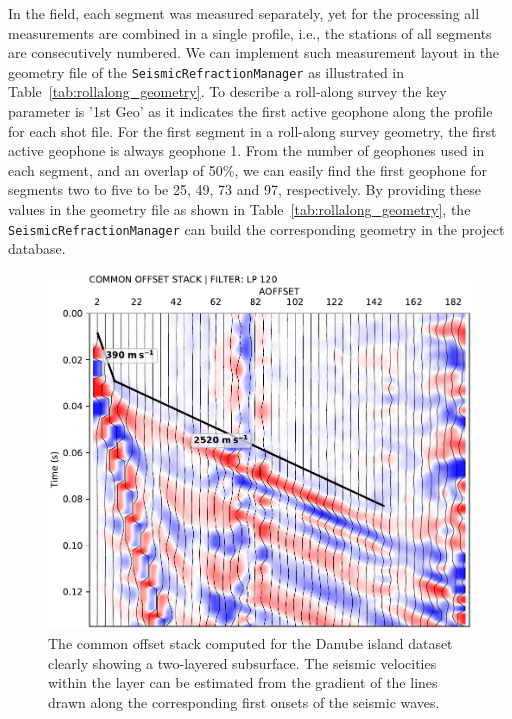 \documentclass[a4paper,fleqn]{cas-sc}
\begin{document}
In the field, each segment was measured separately, yet for the processing all measurements are combined in a single profile, i.e., the stations of all segments are consecutively numbered.
We can implement such measurement layout in the geometry file of the \texttt{SeismicRefractionManager} as illustrated in Table~\ref{tab:rollalong_geometry}. To describe a roll-along survey the key parameter is '1st Geo' as it indicates the first active geophone along the profile for each shot file. For the first segment in a roll-along survey geometry, the first active geophone is always geophone 1. From the number of geophones used in each segment, and an overlap of 50\%, we can easily find the first geophone for segments two to five to be 25, 49, 73 and 97, respectively. By providing these values in the geometry file as shown in Table~\ref{tab:rollalong_geometry}, the \texttt{SeismicRefractionManager} can build the corresponding geometry in the project database.

\begin{figure}
	\centering
	\includegraphics[width=.75\textwidth]{figures/danube_island_cos_lp120.pdf}
	\caption{The common offset stack computed for the Danube island dataset clearly showing a two-layered subsurface. The seismic velocities within the layer can be estimated from the gradient of the lines drawn along the corresponding first onsets of the seismic waves.}
	\label{fig:fieldcos}
\end{figure}
\end{document}
